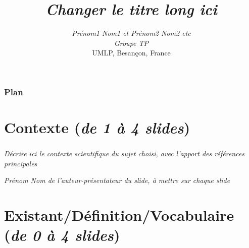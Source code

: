 \documentclass[9pt,handout]{beamer}
\title[\textit{Changer le titre court ici}]{\textit{Changer le titre long ici}}
\author[P. Nom]{\textit{Prénom1 Nom1 et Prénom2 Nom2 etc}\\
\textit{Groupe TP}\\
\vspace{4mm}
UMLP, Besan\c{c}on,
France}
\date{\textit{\today}
\begin{center}
\textit{(Toutes les parties en italique, dont celle-ci, sont à remplacer par vos propres textes)}
\end{center}
}
\begin{document}
\maketitle


\setcounter{tocdepth}{1}     %

\begin{frame}
\frametitle{Plan}
 \tableofcontents
\end{frame}


\section[Contexte]{Contexte (\textit{de 1 à 4 slides})}

\begin{frame}
\frametitle{\secname}

\textit{Décrire ici le contexte scientifique du sujet choisi, avec l'apport des références principales}

\bigskip


\vspace{40pt}

\begin{flushright}
\textit{Prénom Nom de l'auteur-présentateur du slide, à mettre sur chaque slide}
\end{flushright}
\end{frame}


\section{Existant/Définition/Vocabulaire (\textit{de 0 à 4 slides})}
\end{document}
